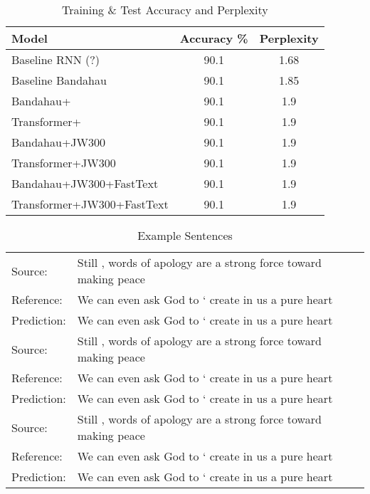 \documentclass{article} %
\begin{document}
 \begin{table}[h]
  \caption{Training \& Test Accuracy and Perplexity}
  \label{tab:results-appendix}
 \begin{center}
  \begin{tabular}{lcc}
    \toprule
    \textbf{Model} & \textbf{Accuracy \%} &\textbf{Perplexity} \\
    \midrule
    Baseline RNN (?) & 90.1 & 1.68 \\
    Baseline Bandahau & 90.1 & 1.85 \\
    \midrule
	Bandahau+ & 90.1 & 1.9 \\ 
	Transformer+ & 90.1 & 1.9 \\ 
    \midrule
	Bandahau+JW300 & 90.1 & 1.9 \\ 
	Transformer+JW300 & 90.1 & 1.9 \\ 
	\midrule
	Bandahau+JW300+FastText & 90.1 & 1.9 \\ 
	Transformer+JW300+FastText & 90.1 & 1.9 \\ 
    \bottomrule
  \end{tabular}
  \end{center}
\end{table}

\begin{table}[h]
\caption{Example Sentences}
\label{results}
\begin{center}
  \begin{tabular}{ll}
  	\toprule
	 Source: &    Still , words of apology are a strong force toward making peace \\
	 Reference:  &   We can even ask God to ‘ create in us a pure heart \\
	 Prediction:  &   We can even ask God to ‘ create in us a pure heart \\
	 \midrule
	 Source: &    Still , words of apology are a strong force toward making peace \\
	 Reference:  &   We can even ask God to ‘ create in us a pure heart \\
	 Prediction:  &   We can even ask God to ‘ create in us a pure heart \\
     \midrule
     Source: &    Still , words of apology are a strong force toward making peace \\
	 Reference:  &   We can even ask God to ‘ create in us a pure heart \\
	 Prediction:  &   We can even ask God to ‘ create in us a pure heart \\
    \bottomrule

  \end{tabular}
\end{center}
\end{table}
\end{document}
